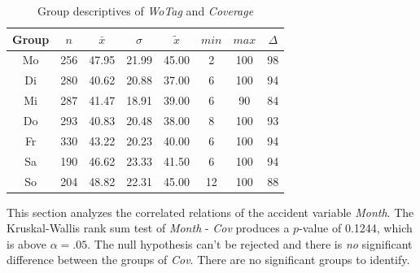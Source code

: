 \begin{table}[ht!]
	\tiny
	\centering
    \begin{tabular}{c|c|c|c|c|c|c|c}
        \toprule
        Group & $n$ & $\bar{x}$ & $\sigma$ & $\tilde{x}$ & $min$ & $max$ & $\Delta$ \\ 
        \midrule
        Mo & 256 & 47.95 & 21.99 & 45.00 & 2  & 100 & 98 \\ 
        Di & 280 & 40.62 & 20.88 & 37.00 & 6  & 100 & 94 \\ 
        Mi & 287 & 41.47 & 18.91 & 39.00 & 6  & 90  & 84 \\ 
        Do & 293 & 40.83 & 20.48 & 38.00 & 8  & 100 & 93 \\ 
        Fr & 330 & 43.22 & 20.23 & 40.00 & 6  & 100 & 94 \\ 
        Sa & 190 & 46.62 & 23.33 & 41.50 & 6  & 100 & 94 \\ 
        So & 204 & 48.82 & 22.31 & 45.00 & 12 & 100 & 88 \\ 
        \bottomrule
      \end{tabular}
	\caption{Group descriptives of \textit{WoTag} and \textit{Coverage}}
	\label{tbl:descriptives_baysis_matched_WoTag_Cov}
\end{table}

This section analyzes the correlated relations of the accident variable \textit{Month}. The Kruskal-Wallis rank sum test of \textit{Month} - \textit{Cov} produces a $p$-value of 0.1244, which is above $\alpha=.05$. The null hypothesis can't be rejected and there is \textit{no} significant difference between the groups of \textit{Cov}. There are no significant groups to identify.